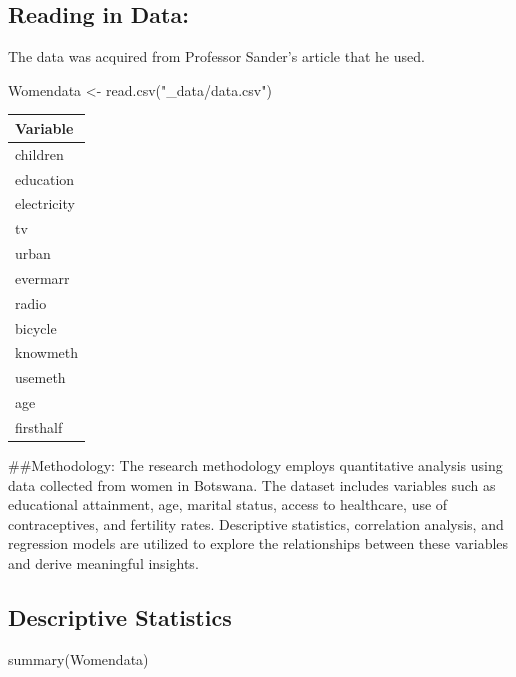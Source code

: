 \documentclass[
  letterpaper,
  DIV=11,
  numbers=noendperiod]{scrartcl}
\newenvironment{Shaded}{\begin{snugshade}}{\end{snugshade}}
\newcommand{\FunctionTok}[1]{\textcolor[rgb]{0.28,0.35,0.67}{#1}}
\newcommand{\NormalTok}[1]{\textcolor[rgb]{0.00,0.23,0.31}{#1}}
\newcommand{\OtherTok}[1]{\textcolor[rgb]{0.00,0.23,0.31}{#1}}
\newcommand{\StringTok}[1]{\textcolor[rgb]{0.13,0.47,0.30}{#1}}
\begin{document}
\hypertarget{reading-in-data}{%
\subsection{Reading in Data:}\label{reading-in-data}}

The data was acquired from Professor Sander's article that he used.

\begin{Shaded}
\begin{Highlighting}[]
\NormalTok{Womendata }\OtherTok{\textless{}{-}}  \FunctionTok{read.csv}\NormalTok{(}\StringTok{"\_data/data.csv"}\NormalTok{)}
\end{Highlighting}
\end{Shaded}

\begin{longtable}[]{@{}l@{}}
\toprule\noalign{}
Variable \\
\midrule\noalign{}
\endhead
\bottomrule\noalign{}
\endlastfoot
children \\
education \\
electricity \\
tv \\
urban \\
evermarr \\
radio \\
bicycle \\
knowmeth \\
usemeth \\
age \\
firsthalf \\
\end{longtable}

\#\#Methodology: The research methodology employs quantitative analysis
using data collected from women in Botswana. The dataset includes
variables such as educational attainment, age, marital status, access to
healthcare, use of contraceptives, and fertility rates. Descriptive
statistics, correlation analysis, and regression models are utilized to
explore the relationships between these variables and derive meaningful
insights.

\hypertarget{descriptive-statistics}{%
\subsection{Descriptive Statistics}\label{descriptive-statistics}}

\begin{Shaded}
\begin{Highlighting}[]
\FunctionTok{summary}\NormalTok{(Womendata)}
\end{Highlighting}
\end{Shaded}
\end{document}

